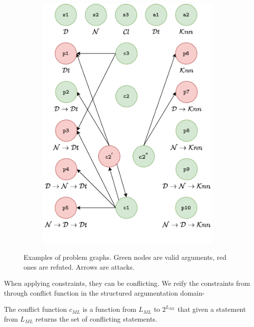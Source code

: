 \begin{figure}
\begin{subfigure}[b]{0.3\textwidth}
        \includegraphics[width=\textwidth]{chapters/human-centric/hamlet/img/toy_example3.png}
        \caption{}
        \label{hamlet-fig:running_c}
    \end{subfigure}
    \caption{Examples of problem graphs. Green nodes are valid arguments, red ones are refuted. Arrows are attacks.}
    \label{hamlet-fig:toy_example}
\end{figure}

When applying constraints, they can be conflicting.
We reify the constraints from  through conflict function in the structured argumentation domain-

\begin{definition}\label{conflictauto}
The conflict function $c_{ML}$ is a function from $L_{ML}$ to $2^{L_{ML}}$ that given a statement from $L_{ML}$ returns the set of conflicting statements.
\end{definition}

